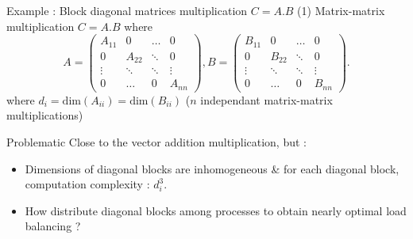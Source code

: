 \documentclass[compress,10pt,aspectratio=169]{beamer}
\begin{document}
\begin{frame}[fragile]{Example : Block diagonal matrices multiplication $C = A.B$ (1)}
    \scriptsize
    Matrix-matrix multiplication $C = A.B$ where
        \[
            A = \left(
                \begin{array}{cccc}
                    A_{11} & 0 & \ldots & 0 \\
                      0    & A_{22} & \ddots & 0 \\
                      \vdots & \ddots & \ddots & \vdots \\
                      0 & \ldots & 0 & A_{nn} 
                \end{array}\right),
            B = \left(
                \begin{array}{cccc}
                    B_{11} & 0 & \ldots & 0 \\
                      0    & B_{22} & \ddots & 0 \\
                      \vdots & \ddots & \ddots & \vdots \\
                      0 & \ldots & 0 & B_{nn} 
                \end{array}\right).
        \]
    where $d_{i} = \mbox{dim}(A_{ii}) = \mbox{dim}(B_{ii})$ ($n$ independant matrix-matrix multiplications)

    \begin{block}{\small Problematic}
        Close to the vector addition multiplication, but :
        \begin{itemize}
            \item Dimensions of diagonal blocks are inhomogeneous \& for each diagonal 
                  block, computation complexity : $d_{i}^{3}$.
            \item How distribute diagonal blocks among processes to obtain nearly optimal load balancing ?
        \end{itemize}
    \end{block}
\end{frame}
\end{document}

